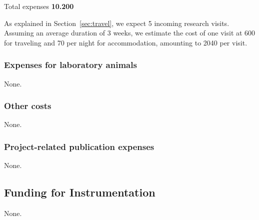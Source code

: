 Total expenses \textbf{10.200 \texteuro}
\medskip

As explained in Section~\ref{sec:travel}, we expect 5 incoming research visits.  Assuming
an average duration of 3 weeks, we estimate the cost of one visit at 600 {\texteuro} for
traveling and 70 {\texteuro} per night for accommodation, amounting to 2040 \texteuro per
visit.

\subsubsection{Expenses for laboratory animals} None.

\subsubsection{Other costs } None.

\subsubsection{Project-related publication expenses} None.

\subsection{Funding for Instrumentation} None.


